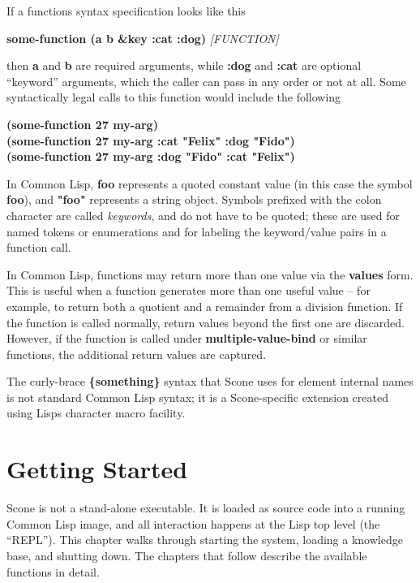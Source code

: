 \documentclass[titlepage,twoside,openright,11pt]{article}
\begin{document}
If a function\textquotesingle s syntax specification looks like this

\textbf{some-function (a b \&key :cat :dog)} \emph{{[}FUNCTION{]}}

then \textbf{a} and \textbf{b} are required arguments, while
\textbf{:dog} and \textbf{:cat} are optional ``keyword'' arguments,
which the caller can pass in any order or not at all. Some syntactically
legal calls to this function would include the following

\textbf{(some-function 27 \textquotesingle my-arg)\\
(some-function 27 \textquotesingle my-arg :cat "Felix" :dog "Fido")\\
(some-function 27 \textquotesingle my-arg :dog "Fido" :cat "Felix")}

In Common Lisp, \textbf{\textquotesingle foo} represents a quoted
constant value (in this case the symbol \textbf{foo}), and
\textbf{"foo"} represents a string object. Symbols prefixed with the
colon character are called \emph{keywords}, and do not have to be
quoted; these are used for named tokens or enumerations and for labeling
the keyword/value pairs in a function call.

In Common Lisp, functions may return more than one value via the
\textbf{values} form. This is useful when a function generates more than
one useful value -- for example, to return both a quotient and a
remainder from a division function. If the function is called normally,
return values beyond the first one are discarded. However, if the
function is called under \textbf{multiple-value-bind} or similar
functions, the additional return values are captured.

The curly-brace \textbf{\{something\}} syntax that Scone uses for
element internal names is not standard Common Lisp syntax; it is a
Scone-specific extension created using Lisp\textquotesingle s character
macro facility.

\section{Getting Started}\label{getting-started}

Scone is not a stand-alone executable. It is loaded as source code into
a running Common Lisp image, and all interaction happens at the Lisp
top level (the ``REPL''). This chapter walks through starting the
system, loading a knowledge base, and shutting down. The chapters that
follow describe the available functions in detail.
\end{document}
